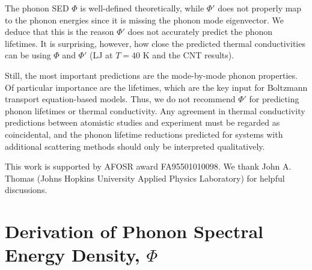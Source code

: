 \documentclass[aps,prb,preprint,superscriptaddress,amsmath,amssymb,floatfix]{revtex4}
\begin{document}
The phonon SED $\Phi$ is well-defined theoretically, while $\Phi'$ does not properly map to the phonon energies since it is missing the phonon mode eigenvector. We deduce that this is the reason $\Phi'$ does not accurately predict the phonon lifetimes. It is surprising, however, how close the predicted thermal conductivities can be using $\Phi$ and $\Phi'$ (LJ at $T=40$ K and the CNT results).

Still, the most important predictions are the mode-by-mode phonon properties. Of particular importance are the lifetimes, which are the key input for Boltzmann transport equation-based models.\cite{mcgaughey2011a} Thus, we do not recommend $\Phi'$ for predicting phonon lifetimes or thermal conductivity.  Any agreement in thermal conductivity predictions between atomistic studies\cite{thomas2010c} and experiment\cite{dekoker2009,qiu2011} must be regarded as coincidental, and the phonon lifetime reductions predicted for systems with additional scattering methods \cite{thomas2010c,shiomi2011a} should only be interpreted qualitatively.

\begin{acknowledgments}
This work is supported by AFOSR award FA95501010098. We thank John A. Thomas (Johns Hopkins University Applied Physics Laboratory) for helpful discussions.
\end{acknowledgments}

\vspace*{110mm}
\appendix
\section{\label{Appendix_A}Derivation of Phonon Spectral Energy Density, $\Phi$}
\end{document}
